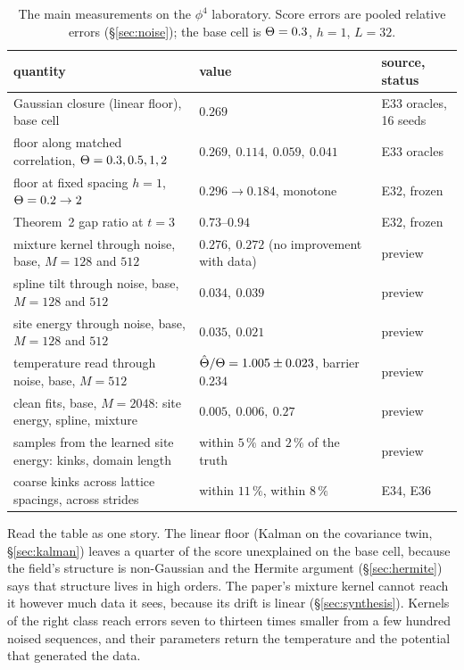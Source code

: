 \begin{table}[h]\centering\small
\caption{The main measurements on the $\phi^4$ laboratory. Score errors are pooled relative errors (\S\ref{sec:noise});
the base cell is $\Theta=0.3$, $h=1$, $L=32$.}
\label{tab:results}
\begin{tabular}{@{}p{6.6cm}p{5.4cm}p{3.3cm}@{}}
\toprule
quantity & value & source, status \\
\midrule
Gaussian closure (linear floor), base cell & $0.269$ & E33 oracles, 16 seeds \\
floor along matched correlation, $\Theta=0.3,0.5,1,2$ & $0.269,\ 0.114,\ 0.059,\ 0.041$ & E33 oracles \\
floor at fixed spacing $h=1$, $\Theta=0.2\to2$ & $0.296\to0.184$, monotone & E32, frozen \\
Theorem~2 gap ratio at $t=3$ & $0.73$--$0.94$ & E32, frozen \\
mixture kernel through noise, base, $M=128$ and $512$ & $0.276,\ 0.272$ (no improvement with data) & preview \\
spline tilt through noise, base, $M=128$ and $512$ & $0.034,\ 0.039$ & preview \\
site energy through noise, base, $M=128$ and $512$ & $0.035,\ 0.021$ & preview \\
temperature read through noise, base, $M=512$ & $\hat{\Theta}/\Theta=1.005\pm0.023$, barrier $0.234$ & preview \\
clean fits, base, $M=2048$: site energy, spline, mixture & $0.005,\ 0.006,\ 0.27$ & preview \\
samples from the learned site energy: kinks, domain length & within $5\,\%$ and $2\,\%$ of the truth & preview \\
coarse kinks across lattice spacings, across strides & within $11\,\%$, within $8\,\%$ & E34, E36 \\
\bottomrule
\end{tabular}
\end{table}

Read the table as one story. The linear floor (Kalman on the covariance twin, \S\ref{sec:kalman}) leaves a quarter
of the score unexplained on the base cell, because the field's structure is non-Gaussian and the Hermite
argument (\S\ref{sec:hermite}) says that structure lives in high orders. The paper's mixture kernel cannot reach it
however much data it sees, because its drift is linear (\S\ref{sec:synthesis}). Kernels of the right class reach
errors seven to thirteen times smaller from a few hundred noised sequences, and their parameters return the temperature and
the potential that generated the data.


